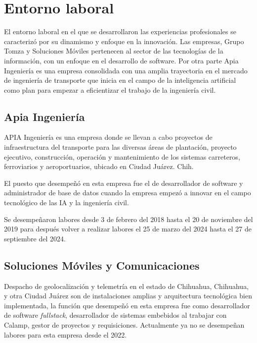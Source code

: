 \documentclass[protocolo.tex]{subfiles}
\begin{document}
\section{Entorno laboral}

El entorno laboral en el que se desarrollaron las experiencias profesionales se caracterizó por su dinamismo y enfoque en la innovación.
Las empresas, Grupo Tomza y Soluciones Móviles pertenecen al sector de las tecnologías de la información, con un enfoque en el desarrollo de software. Por otra parte Apia Ingeniería es una empresa consolidada con una amplia trayectoria en el mercado de ingeniería de transporte que inicia en el campo de la inteligencia artificial como plan para empezar a eficientizar el trabajo de la ingeniería civil.

\subsection{Apia Ingeniería}


APIA Ingeniería es una empresa donde se llevan a cabo proyectos de infraestructura del transporte para las diversas áreas de plantación, proyecto ejecutivo, construcción, operación y mantenimiento de los sistemas carreteros, ferroviarios y aeroportuarios, ubicado en Ciudad Juárez. Chih. \vspace{5mm} 

El puesto que desempeñó en esta empresa fue el de desarrollador de software y administrador de base de datos cuando la empresa empezó a innovar en el campo tecnológico de las IA y la ingeniería civil.

\vspace{5mm} 


Se desempeñaron labores desde 3 de febrero del 2018 hasta el 20 de noviembre del 2019 para después volver a realizar labores el 25 de marzo del 2024 hasta el 27 de septiembre del 2024.

\subsection{Soluciones Móviles y Comunicaciones}
Despacho de geolocalización y telemetría en el estado de Chihuahua, Chihuahua, y otra Ciudad Juárez son de instalaciones amplias y arquitectura tecnológica bien implementada, la función que desempeñó en esta empresa fue como desarrollador de software \textit{fullstack}, desarrollador de sistemas embebidos al trabajar con Calamp, gestor de proyectos y requisiciones. Actualmente ya no se desempeñan labores para esta empresa desde el 2022.\vspace{5mm} 
\end{document}
